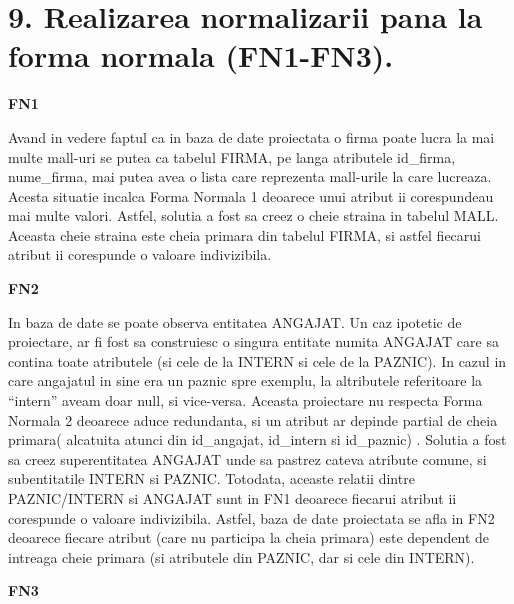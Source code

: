 
\section*{9. Realizarea normalizarii pana la forma normala (FN1-FN3).}

\vspace{1cm}

\centering \textbf{FN1}

\vspace{0.2cm}

Avand in vedere faptul ca in baza de date proiectata o firma poate lucra la mai multe mall-uri se putea ca tabelul FIRMA, pe langa atributele id\_firma, nume\_firma, mai putea avea o lista care reprezenta mall-urile la care lucreaza. Acesta situatie incalca Forma Normala 1 deoarece unui atribut ii corespundeau mai multe valori. Astfel, solutia a fost sa creez o cheie straina in tabelul MALL. Aceasta cheie straina este cheia primara din tabelul FIRMA, si astfel fiecarui atribut ii corespunde o valoare indivizibila. 

\vspace{0.5cm}

\textbf{FN2}

\vspace{0.2cm}

In baza de date se poate observa entitatea ANGAJAT. Un caz ipotetic de proiectare, ar fi fost sa construiesc o singura entitate numita ANGAJAT care sa contina toate atributele (si cele de la INTERN si cele de la PAZNIC). In cazul in care angajatul in sine era un paznic spre exemplu, la altributele referitoare la “intern” aveam doar null, si vice-versa. Aceasta proiectare nu respecta Forma Normala 2 deoarece aduce redundanta, si un atribut ar depinde partial de cheia primara( alcatuita atunci din id\_angajat, id\_intern si id\_paznic) . Solutia a fost sa creez superentitatea ANGAJAT unde sa pastrez cateva atribute comune, si
subentitatile INTERN si PAZNIC. Totodata, aceaste relatii dintre PAZNIC/INTERN si
ANGAJAT sunt in FN1 deoarece fiecarui atribut ii corespunde o valoare indivizibila. Astfel, baza de date proiectata se afla in FN2 deoarece fiecare atribut (care nu participa la cheia primara) este dependent de intreaga cheie primara (si atributele din PAZNIC, dar si cele din INTERN).

\vspace{0.5cm}

\textbf{FN3}

\vspace{0.2cm}

